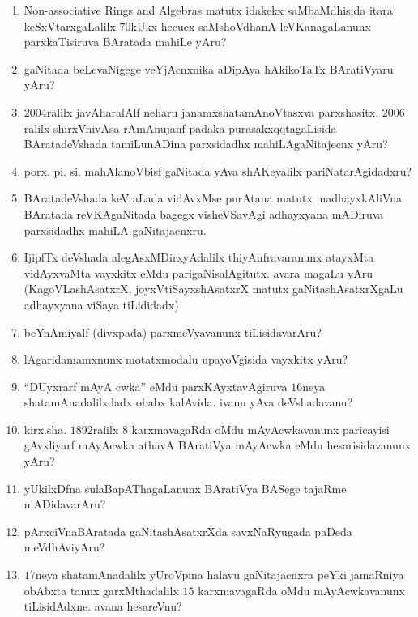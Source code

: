 \begin{enumerate}
\item {\rm Non-associative Rings and Algebras} matutx idakekx saMbaMdhisida itara keSxVtarxgaLalilx $70$kUkx hecucx saMshoVdhanA leVKanagaLanunx  parxkaTisiruva BAratada mahiLe yAru?
  
\item gaNitada beLevaNigege veYjAcnxnika aDipAya hAkikoTaTx BAratiVyaru yAru?
  
\item $2004$ralilx javAharalAlf neharu janamxshatamAnoVtasxva parxshasitx, $2006$ralilx shirxVnivAsa rAmAnujanf padaka purasakxqqtagaLisida BAratadeVshada tamiLunADina parxsidadhx mahiLAgaNitajecnx yAru?

\item porx. pi. si. mahAlanoVbisf gaNitada yAva shAKeyalilx pariNatarAgidadxru?
  
\item BAratadeVshada keVraLada vidAvxMse purAtana matutx madhayxkAliVna BAratada reVKAgaNitada bagegx visheVSavAgi adhayxyana mADiruva parxsidadhx mahiLA gaNitajacnxru.
  
\item IjipfTx deVshada alegAsxMDirxyAdalilx thiyAnfravaranunx atayxMta vidAyxvaMta vayxkitx eMdu parigaNisalAgitutx. avara magaLu yAru (KagoVLashAsatxrX, joyxVtiSayxshAsatxrX matutx gaNitashAsatxrXgaLu adhayxyana viSaya tiLididadx)
  
\item beYnAmiyalf (divxpada) parxmeVyavanunx tiLisidavarAru?
  
\item lAgaridamamxnunx motatxmodalu upayoVgisida vayxkitx yAru?
  
\item ``DUyxrarf mAyA cwka'' eMdu parxKAyxtavAgiruva $16$neya shatamAnadalilxdadx obabx kalAvida. ivanu yAva deVshadavanu?
  
\item kirx.sha. $1892$ralilx $8$ karxmavagaRda oMdu mAyAcwkavanunx paricayisi gAvxliyarf mAyAcwka athavA BAratiVya mAyAcwka eMdu hesarisidavanunx yAru?
 
\item yUkilxDfna sulaBapAThagaLanunx BAratiVya BASege tajaRme mADidavarAru?

\item pArxciVnaBAratada gaNitashAsatxrXda savxNaRyugada paDeda meVdhAviyAru?
  
\item $17$neya shatamAnadalilx yUroVpina halavu gaNitajacnxra peYki  jamaRniya obAbxta tannx garxMthadalilx $15$ karxmavagaRda oMdu mAyAcwkavanunx tiLisidAdxne. avana hesareVnu?
  

\end{enumerate}
